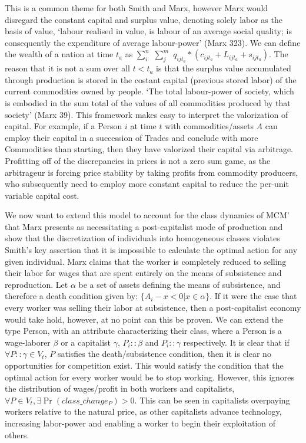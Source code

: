 \documentclass[12pt]{article}
\begin{document}
This is a common theme for both Smith and Marx, however Marx would disregard the constant capital and surplus value, denoting solely labor as the basis of value, `labour realised in value, is labour of an average social quality; is consequently the expenditure of average labour-power' (Marx 323).
We can define the wealth of a nation at time $t_a$ as $\sum\limits_i^n$ $\sum\limits_j^m$ $q_{ijt_{a}} * (c_{ijt_{a}} + L_{ijt_{a}} + s_{ijt_{a}})$. 
The reason that it is not a sum over all $t < t_a$ is that the surplus value accumulated through production is stored in the costant capital (previous stored labor) of the current commodities owned by people. `The total labour-power of society, which is embodied in the sum total of the values of all commodities produced by that society' (Marx 39).
This framework makes easy to interpret the valorization of capital.
For example, if a Person $i$ at time $t$ with commodities/assets $A$ can employ their capital in a succession of Trades and conclude with more Commodities than starting, then they have valorized their capital via arbitrage.
Profitting off of the discrepancies in prices is not a zero sum game, as the arbitrageur is forcing price stability by taking profits from commodity producers, who subsequently need to employ more constant capital to reduce the per-unit variable capital cost. \par

We now want to extend this model to account for the class dynamics of MCM' that Marx presents as necessitating a post-capitalist mode of production and show that the discretization of individuals into homogeneous classes violates Smith's key assertion that it is impossible to calculate the optimal action for any given individual.
Marx claims that the worker is completely reduced to selling their labor for wages that are spent entirely on the means of subsistence and reproduction. 
Let $\alpha$ be a set of assets defining the means of subsistence, and therefore a death condition given by: $\{A_i - x < 0| x \in \alpha \}$.
If it were the case that every worker was selling their labor at subsistence, then a post-capitalist economy would take hold, however, at no point can this be proven. 
We can extend the type Person, with an attribute characterizing their class, where a Person is a wage-laborer $\beta$ or a capitalist $\gamma$, $P_i::\beta$ and $P_i::\gamma$ respectively.
It is clear that if $\forall P::\gamma \in V_t$, $P$ satisfies the death/subsistence condition, then it is clear no opportunities for competition exist. 
This would satisfy the condition that the optimal action for every worker would be to stop working.
However, this ignores the distribution of wages/profit in both workers and capitalists, $\forall P \in V_t, \exists \Pr(class\_change_P) > 0$.
This can be seen in capitalists overpaying workers relative to the natural price, as other capitalists advance technology, increasing labor-power and enabling a worker to begin their exploitation of others. \par
\end{document}
